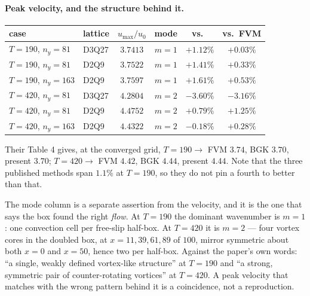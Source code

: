 \documentclass[11pt,a4paper]{article}
\begin{document}
\paragraph{Peak velocity, and the structure behind it.}

\begin{center}\small
\begin{tabular}{llcccc}
\toprule
case & lattice & $u_{\max}/u_0$ & mode & vs.\ \cite{patnaik2025} & vs.\ FVM \\
\midrule
$T=190$, $n_y=81$  & D3Q27 & $3.7413$ & $m=1$ & $+1.12\%$ & $+0.03\%$ \\
$T=190$, $n_y=81$  & D2Q9  & $3.7522$ & $m=1$ & $+1.41\%$ & $+0.33\%$ \\
$T=190$, $n_y=163$ & D2Q9  & $3.7597$ & $m=1$ & $+1.61\%$ & $+0.53\%$ \\[1mm]
$T=420$, $n_y=81$  & D3Q27 & $4.2804$ & $m=2$ & $-3.60\%$ & $-3.16\%$ \\
$T=420$, $n_y=81$  & D2Q9  & $4.4752$ & $m=2$ & $+0.79\%$ & $+1.25\%$ \\
$T=420$, $n_y=163$ & D2Q9  & $\bm{4.4322}$ & $m=2$ & $\bm{-0.18\%}$ & $+0.28\%$ \\
\bottomrule
\end{tabular}
\end{center}

\noindent Their Table 4 gives, at the converged grid, $T=190\to$ FVM $3.74$, BGK
$3.70$, present $3.70$; $T=420\to$ FVM $4.42$, BGK $4.44$, present $4.44$. Note
that the three published methods span $1.1\%$ at $T=190$, so they do not pin a
fourth to better than that.

The mode column is a separate assertion from the velocity, and it is the one that
says the box found the right \emph{flow}. At $T=190$ the dominant wavenumber is
$m=1$: one convection cell per free-slip half-box. At $T=420$ it is $m=2$ ---
four vortex cores in the doubled box, at $x=11,39,61,89$ of $100$, mirror
symmetric about both $x=0$ and $x=50$, hence two per half-box. Against the
paper's own words: ``a single, weakly defined vortex-like structure'' at $T=190$
and ``a strong, symmetric pair of counter-rotating vortices'' at $T=420$. A peak
velocity that matches with the wrong pattern behind it is a coincidence, not a
reproduction.
\end{document}
